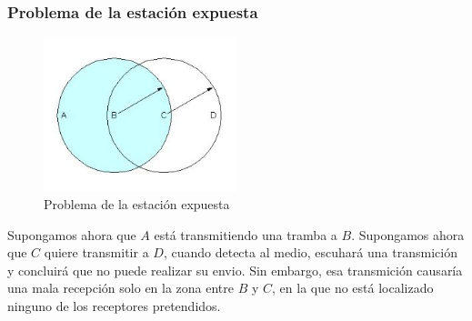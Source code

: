 \subsubsection*{Problema de la estación expuesta}
\begin{figure}[H]
	\centering
	\includegraphics[width=0.5\textwidth
]{images/estacion-descubierta.jpg}
	\caption[Problema de la estación expuesta]{Problema de la estación expuesta}
	\label{fig:estacion-expuesta}
\end{figure}

Supongamos ahora que \(A\) está transmitiendo una tramba a \(B\). Supongamos ahora que \(C\) quiere transmitir a \(D\), cuando detecta al medio, escuhará una transmición y concluirá que no puede realizar su envio. Sin embargo, esa transmición causaría una mala recepción solo en la zona entre \(B\) y \(C\), en la que no está localizado ninguno de los receptores pretendidos.
